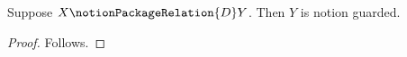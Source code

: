 

\begin{proposition}\label{notion_package_wrong_argument}
    Suppose $X\notionPackageRelation{D}Y$.
    Then $Y$ is notion guarded.
\end{proposition}
\begin{proof}
    Follows.
\end{proof}

